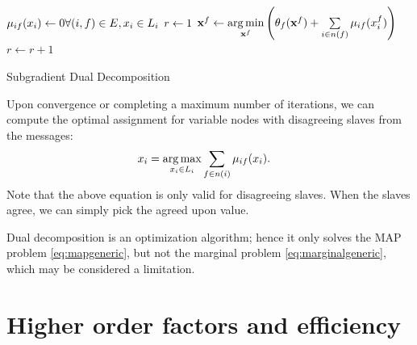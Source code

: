\documentclass[letterpaper, 10 pt, conference]{ieeeconf} %
\providecommand{\DontPrintSemicolon}{\dontprintsemicolon} %
\DeclareMathOperator*{\argmin}{arg\,min}
\DeclareMathOperator*{\argmax}{arg\,max}
\begin{document}
\begin{algorithm}
  \DontPrintSemicolon

  $\msg{i}{f}{x_i} \assign 0 \hfill \forall (i, f) \in E, x_i \in \Sx$\;
  $r \leftarrow 1$\;
   {
     {%
      $\map^f \assign \argmin\limits_{\map^f} \left( \theta_f(\map^f) + \sum\limits_{i \in n(f)}\msg{i}{f}{x^f_i} \right)$\;
    }
     {
    }
    $r \leftarrow r + 1$\;
  }
  \caption{Subgradient Dual Decomposition}
  \label{alg:dualdecomposition}
\end{algorithm}
Upon convergence or completing a maximum number of iterations, we can compute the
optimal assignment for variable nodes with disagreeing slaves from the
messages:
\begin{align}
  x_i &= \argmax\limits_{x_i \in \Sx} \sum\limits_{f \in n(i)}\msg{i}{f}{x_i}.
\end{align}
Note that the above equation is only valid for disagreeing slaves. When 
the slaves agree, we can simply pick the agreed upon value.

Dual decomposition is an optimization algorithm; hence it
only solves the MAP problem \eqref{eq:mapgeneric}, but not the marginal problem
\eqref{eq:marginalgeneric}, which may be considered a limitation.


\section{Higher order factors and efficiency}
\end{document}
